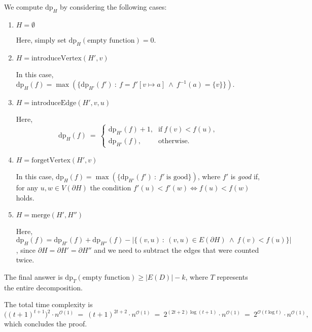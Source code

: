 \documentclass[12pt]{article}
\begin{document}
	We compute \(\text{dp}_{H}\) by considering the following cases:
	\begin{enumerate}
		\item \(H = \emptyset\)
		      
		      Here, simply set \(\text{dp}_{H}(\text{empty function}) = 0\).
		
		\item \(H = \text{introduceVertex}(H', v)\)
		      
		      In this case, \(\text{dp}_{H}(f) = \max(\{\text{dp}_{H'}(f') \ : \
		      f = f'[v \mapsto a] \ \wedge \ f^{-1}(a) = \{v\}\})\).
		
		\item \(H = \text{introduceEdge}(H', v, u)\)
		      
		      Here,
		      \[ \text{dp}_{H}(f) \ = \ \begin{cases} \text{dp}_{H'}(f) + 1
		      \text{,} & \text{if} \ f(v) < f(u) \text{,} \\
		      \text{dp}_{H'}(f) \text{,} & \text{otherwise.} \end{cases} \]
		
		\item \(H = \text{forgetVertex}(H', v)\)
		      
		      In this case, \(\text{dp}_{H}(f) = \max(\{\text{dp}_{H'}(f') \ : \
		      f' \ \text{is good}\})\), where \(f'\) is \textit{good} if, for
		      any \(u, w \in V(\partial H)\) the condition \(f'(u) < f'(w) \iff
		      f(u) < f(w)\) holds.
		
		\item \(H = \text{merge}(H', H'')\)
		      
		      Here, \(\text{dp}_{H}(f) = \text{dp}_{H'}(f) +
		      \text{dp}_{H''}(f) - |\{(v, u) \ : \ (v, u) \in E(\partial H) \
		      \wedge \ f(v) < f(u)\}|\), since \(\partial H = \partial H' =
		      \partial H''\) and we need to subtract the edges that were counted
		      twice.
	\end{enumerate}
	The final answer is \(\text{dp}_{T}(\text{empty function}) \geqslant |E(D)|
	- k\), where \(T\) represents the entire decomposition.
	
	\medskip
	
	The total time complexity is
	\[ \big( (t + 1)^{t + 1} \big)^{2} \cdot n^{\mathcal{O}(1)} \ = \
	(t + 1)^{2t + 2} \cdot n^{\mathcal{O}(1)} \ = \ 2^{(2t + 2) \log (t + 1)}
	\cdot n^{\mathcal{O}(1)} \ = \ 2^{\mathcal{O}(t \log t)} \cdot
	n^{\mathcal{O}(1)} \text{,} \]
	which concludes the proof.
\end{document}
